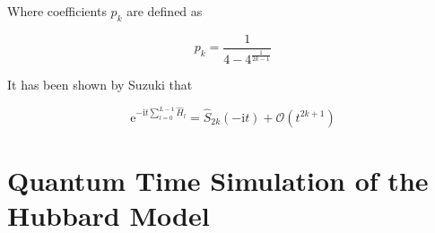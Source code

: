   Where coefficients $p_k$ are defined as

  \begin{equation}
    p_k = \frac{1}{4 - 4^{\frac{1}{2k-1}}}
    \label{eq:pk}
  \end{equation}

  It has been shown by Suzuki that \cite{SuzukiFormula}

  \begin{equation}
    \mathrm{e}^{-\mathrm{i}t \sum_{l = 0}^{L-1} \hat{H}_l} = \hat{S}_{2k}(-\mathrm{i}t) + \mathcal{O}(t^{2k+1})
  \end{equation}
  

\section{Quantum Time Simulation of the Hubbard Model}
\label{sec:hubbard}
  \lipsum[2-4]
